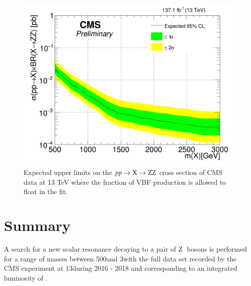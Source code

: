  \begin{figure}[!h]
 \centering
 \centerline{
 \includegraphics[width=\textwidth]{figures/HighMassSearches/Limit/highMassLimit_spin0_2D_13TeV_run2__run2_22may_blind_.png}
 }
 \caption{
 Expected upper limits on the $pp\to {\rm X}\to  {\rm ZZ}$ cross section
 of CMS data at 13 TeV where the fraction of VBF production is allowed to float in the fit.
 \label{fig:highmassresult}}
 \end{figure}

 \section{Summary}
 \label{sec:Summary}

  A search for a new scalar resonance decaying to a pair of $\mathrm{Z}\hspace{0.2em}$ bosons is performed for a range of masses
 between 500\GeV and 3\TeV with the full data set recorded by the CMS experiment at 13\TeV during 2016 - 2018
 and corresponding to an integrated luminosity of \usedLumi.



